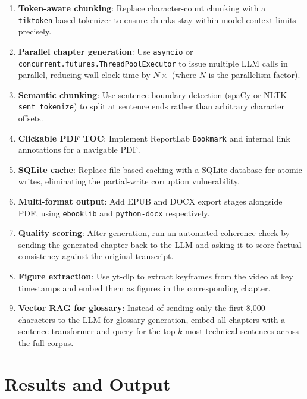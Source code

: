 \documentclass[11pt,a4paper]{article}
\begin{document}
\begin{enumerate}[leftmargin=1.5em]
    \item \textbf{Token-aware chunking}: Replace character-count chunking with a \texttt{tiktoken}-based tokenizer to ensure chunks stay within model context limits precisely.

    \item \textbf{Parallel chapter generation}: Use \texttt{asyncio} or \texttt{concurrent.futures.ThreadPoolExecutor} to issue multiple LLM calls in parallel, reducing wall-clock time by $N\times$ (where $N$ is the parallelism factor).

    \item \textbf{Semantic chunking}: Use sentence-boundary detection (spaCy or NLTK \texttt{sent\_tokenize}) to split at sentence ends rather than arbitrary character offsets.

    \item \textbf{Clickable PDF TOC}: Implement ReportLab \texttt{Bookmark} and internal link annotations for a navigable PDF.

    \item \textbf{SQLite cache}: Replace file-based caching with a SQLite database for atomic writes, eliminating the partial-write corruption vulnerability.

    \item \textbf{Multi-format output}: Add EPUB and DOCX export stages alongside PDF, using \texttt{ebooklib} and \texttt{python-docx} respectively.

    \item \textbf{Quality scoring}: After generation, run an automated coherence check by sending the generated chapter back to the LLM and asking it to score factual consistency against the original transcript.

    \item \textbf{Figure extraction}: Use yt-dlp to extract keyframes from the video at key timestamps and embed them as figures in the corresponding chapter.

    \item \textbf{Vector RAG for glossary}: Instead of sending only the first 8,000 characters to the LLM for glossary generation, embed all chapters with a sentence transformer and query for the top-$k$ most technical sentences across the full corpus.
\end{enumerate}

\section{Results and Output}
\end{document}

